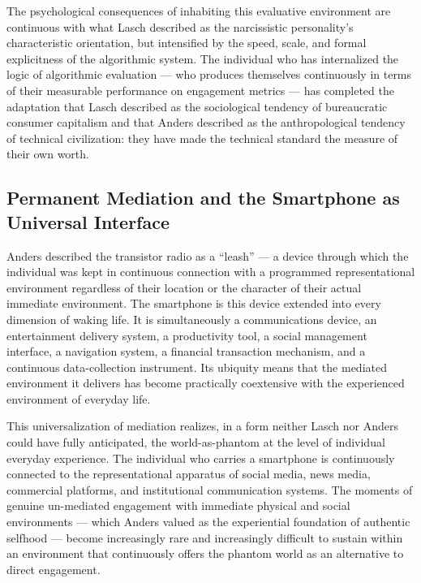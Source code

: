 \documentclass[12pt]{memoir}
\begin{document}
The psychological consequences of inhabiting this evaluative environment are continuous with
what Lasch described as the narcissistic personality's characteristic orientation, but
intensified by the speed, scale, and formal explicitness of the algorithmic system. The
individual who has internalized the logic of algorithmic evaluation — who produces themselves
continuously in terms of their measurable performance on engagement metrics — has completed
the adaptation that Lasch described as the sociological tendency of bureaucratic consumer
capitalism and that Anders described as the anthropological tendency of technical civilization:
they have made the technical standard the measure of their own worth.

\subsection{Permanent Mediation and the Smartphone as Universal Interface}

Anders described the transistor radio as a \enquote{leash} — a device through which the
individual was kept in continuous connection with a programmed representational environment
regardless of their location or the character of their actual immediate environment. The
smartphone is this device extended into every dimension of waking life. It is simultaneously
a communications device, an entertainment delivery system, a productivity tool, a social
management interface, a navigation system, a financial transaction mechanism, and a continuous
data-collection instrument. Its ubiquity means that the mediated environment it delivers has
become practically coextensive with the experienced environment of everyday life.

This universalization of mediation realizes, in a form neither Lasch nor Anders could have
fully anticipated, the world-as-phantom at the level of individual everyday experience. The
individual who carries a smartphone is continuously connected to the representational apparatus
of social media, news media, commercial platforms, and institutional communication systems.
The moments of genuine un-mediated engagement with immediate physical and social
environments — which Anders valued as the experiential foundation of authentic selfhood —
become increasingly rare and increasingly difficult to sustain within an environment that
continuously offers the phantom world as an alternative to direct engagement.

\end{document}
